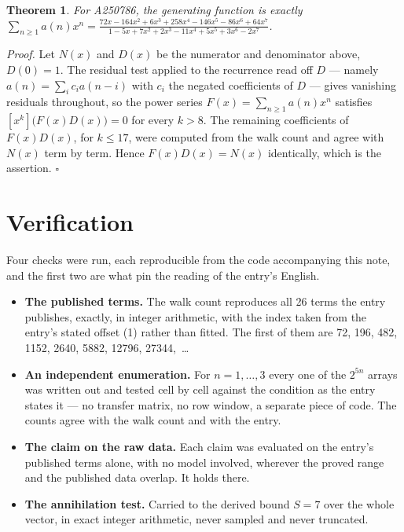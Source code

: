 \documentclass[11pt]{article}
\newtheorem{theorem}{Theorem}
\theoremstyle{definition}
\begin{document}
\begin{theorem} For A250786, the generating function is exactly $\sum_{n\ge 1} a(n)x^n = \frac{72x - 164x^{2} + 6x^{3} + 258x^{4} - 146x^{5} - 86x^{6} + 64x^{7}}{1 - 5x + 7x^{2} + 2x^{3} - 11x^{4} + 5x^{5} + 3x^{6} - 2x^{7}}$.\end{theorem}

{\itshape Proof.} Let $N(x)$ and $D(x)$ be the numerator and denominator above, $D(0)=1$. The residual test applied to the recurrence read off $D$ --- namely $a(n) = \sum_i c_i a(n-i)$ with $c_i$ the negated coefficients of $D$ --- gives vanishing residuals throughout, so the power series $F(x)=\sum_{n\ge 1}a(n)x^n$ satisfies $[x^k]\bigl(F(x)D(x)\bigr) = 0$ for every $k > 8$. The remaining coefficients of $F(x)D(x)$, for $k \le 17$, were computed from the walk count and agree with $N(x)$ term by term. Hence $F(x)D(x) = N(x)$ identically, which is the assertion. $\square$

\section{Verification}

Four checks were run, each reproducible from the code accompanying this note, and the first two are what pin the reading of the entry's English.

\begin{itemize}

\item {\bfseries The published terms.} The walk count reproduces all 26 terms the entry publishes, exactly, in integer arithmetic, with the index taken from the entry's stated offset (1) rather than fitted. The first of them are 72, 196, 482, 1152, 2640, 5882, 12796, 27344,~\dots

\item {\bfseries An independent enumeration.} For $n = 1,\dots,3$ every one of the $2^{5n}$ arrays was written out and tested cell by cell against the condition as the entry states it --- no transfer matrix, no row window, a separate piece of code. The counts agree with the walk count and with the entry.

\item {\bfseries The claim on the raw data.} Each claim was evaluated on the entry's published terms alone, with no model involved, wherever the proved range and the published data overlap. It holds there.

\item {\bfseries The annihilation test.} Carried to the derived bound $S = 7$ over the whole vector, in exact integer arithmetic, never sampled and never truncated.

\end{itemize}
\end{document}

